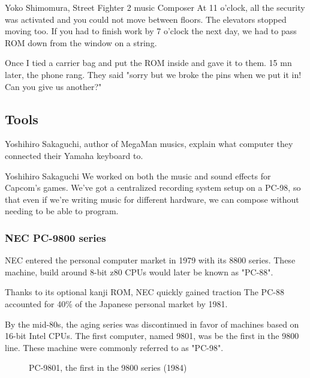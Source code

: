 \begin{q}{Yoko Shimomura, Street Fighter 2 music Composer\cite{sf2musicsecurity}}
At 11 o'clock, all the security was activated and you could not move between floors. The elevators stopped moving too. If you had to finish work by 7 o'clock the next day, we had to pass ROM down from the window on a string.

Once I tied a carrier bag and put the ROM inside and gave it to them. 15 mn later, the phone rang. They said "sorry but we broke the pins when we put it in! Can you give us another?"
\end{q}



\subsection{Tools}
Yoshihiro Sakaguchi, author of MegaMan musics, explain what computer they connected their Yamaha keyboard to.

\begin{q}{Yoshihiro Sakaguchi\cite{yoko_shimomura_interview}  }
We worked on both the music and sound effects for Capcom’s games. We’ve got a centralized recording system setup on a PC-98, so that even if we’re writing music for different hardware, we can compose without needing to be able to program.
\end{q}

\subsubsection{NEC PC-9800 series}

NEC entered the personal computer market in 1979 with its 8800 series. These machine, build around 8-bit z80 CPUs would later be known as "PC-88". 

Thanks to its optional kanji ROM, NEC quickly gained traction The PC-88 accounted for 40\% of the Japanese personal market by 1981.

By the mid-80s, the aging series was discontinued in favor of machines based on 16-bit Intel CPUs. The first computer, named 9801, was be the first in the 9800 line. These machine were commonly referred to as "PC-98".

\begin{figure}[H]

\caption*{PC-9801, the first in the 9800 series (1984)}
\end{figure}

